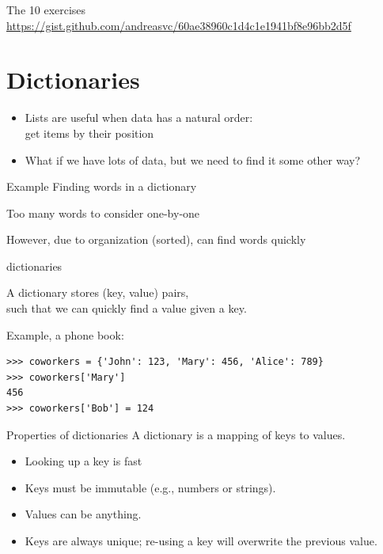\documentclass[aspectratio=169,usenames,dvipsnames]{beamer}
\begin{document}
\begin{frame}{The 10 exercises}
    \centering\Large
    \url{https://gist.github.com/andreasvc/60ae38960c1d4c1e1941bf8e96bb2d5f}
\end{frame}



\section{Dictionaries}
\frame{\tableofcontents[currentsection]}

\begin{frame}
    \begin{itemize}
        \item Lists are useful when data has a natural order: \\
            get items by their position
        \pause
        \item What if we have lots of data,
            but we need to find it some other way?
    \end{itemize}

    \begin{block}{Example}
    Finding words in a dictionary

    Too many words to consider one-by-one

    However, due to organization (sorted), can find words quickly
    \end{block}
\end{frame}


\begin{frame}[fragile]{dictionaries}
    \begin{definition}
        A dictionary stores (key, value) pairs, \\
        such that we can quickly find a value given a key.
    \end{definition}
Example, a phone book:
\begin{lstlisting}
>>> coworkers = {'John': 123, 'Mary': 456, 'Alice': 789}
>>> coworkers['Mary']
456
>>> coworkers['Bob'] = 124
\end{lstlisting}

\end{frame}

\begin{frame}{Properties of dictionaries}
A dictionary is a mapping of keys to values.

    \begin{itemize}
        \item Looking up a key is fast
        \item Keys must be immutable (e.g., numbers or strings).
        \item Values can be anything.
        \item Keys are always unique;
            re-using a key will overwrite the previous value.
    \end{itemize}
\end{frame}
\end{document}
